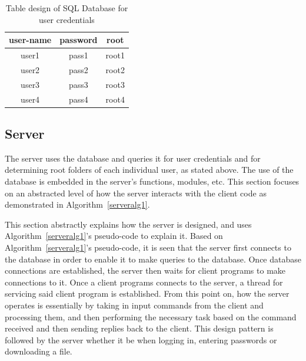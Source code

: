 \documentclass[journal, a4paper]{IEEEtran}
\begin{document}
\begin{table}[hbtp!]
	\caption{Table design of SQL Database for user credentials}
	\label{tasks}
	\begin{center}
		\begin{tabular}{| c | c | c |}
			\hline
			user-name & password & root\\
			\hline
			user1 & pass1 & root1\\
			\hline
			user2 & pass2 & root2\\
			\hline
			user3 & pass3 & root3\\
			\hline
			user4 & pass4 & root4\\
			\hline
		\end{tabular}
	\end{center}
\end{table}

\subsection{Server}
The server uses the database and queries it for user credentials and for determining root folders of each individual user, as stated above. The use of the database is embedded in the server's functions, modules, etc. This section focuses on an abstracted level of how the server interacts with the client code as demonstrated in Algorithm~\ref{serveralg1}. 

This section abstractly explains how the server is designed, and uses Algorithm~\ref{serveralg1}'s pseudo-code to explain it. Based on Algorithm~\ref{serveralg1}'s pseudo-code, it is seen that the server first connects to the database in order to enable it to make queries to the database. Once database connections are established, the server then waits for client programs to make connections to it. Once a client programs connects to the server, a thread for servicing said client program is established. From this point on, how the server operates is essentially by taking in input commands from the client and processing them, and then performing the necessary task based on the command received and then sending replies back to the client. This design pattern is followed by the server whether it be when logging in, entering passwords or downloading a file.
\end{document}
